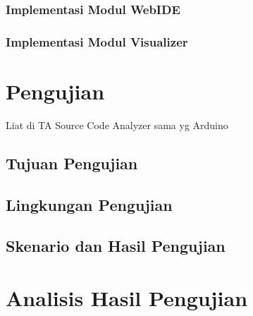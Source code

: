 \subsubsection{Implementasi Modul WebIDE}
\blindtext
\subsubsection{Implementasi Modul Visualizer}
\blindtext


\section{Pengujian}

Liat di TA Source Code Analyzer sama yg Arduino

\subsection{Tujuan Pengujian}
\blindtext

\subsection{Lingkungan Pengujian}
\blindtext

\subsection{Skenario dan Hasil Pengujian}
\blindtext


\section{Analisis Hasil Pengujian}
\blindtext
